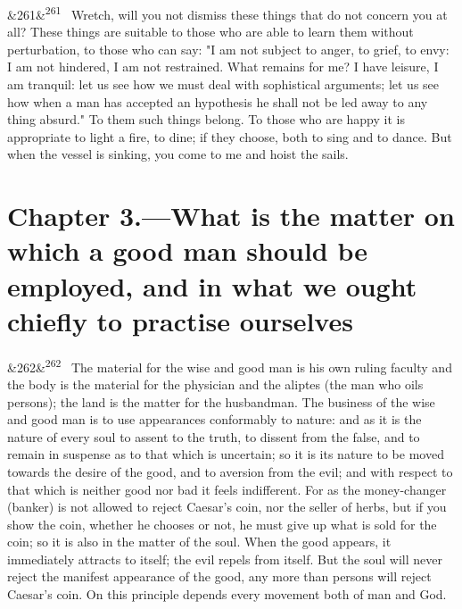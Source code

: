 \documentclass[12pt]{article}
\newcommand{\para}[1][]{\par\noindent\ifx&#1&\else\textsuperscript{\footnotesize #1}~\fi}
\begin{document}
\para[261] Wretch, will you not dismiss these things that do not concern you at all? These things are suitable to those who are able to learn them without perturbation, to those who can say: "I am not subject to anger, to grief, to envy: I am not hindered, I am not restrained. What remains for me? I have leisure, I am tranquil: let us see how we must deal with sophistical arguments; let us see how when a man has accepted an hypothesis he shall not be led away to any thing absurd." To them such things belong. To those who are happy it is appropriate to light a fire, to dine; if they choose, both to sing and to dance. But when the vessel is sinking, you come to me and hoist the sails.

\section*{Chapter 3.---What is the matter on which a good man should be employed, and in what we ought chiefly to practise ourselves}

\para[262] The material for the wise and good man is his own ruling faculty and the body is the material for the physician and the aliptes (the man who oils persons); the land is the matter for the husbandman. The business of the wise and good man is to use appearances conformably to nature: and as it is the nature of every soul to assent to the truth, to dissent from the false, and to remain in suspense as to that which is uncertain; so it is its nature to be moved towards the desire of the good, and to aversion from the evil; and with respect to that which is neither good nor bad it feels indifferent. For as the money-changer (banker) is not allowed to reject Caesar's coin, nor the seller of herbs, but if you show the coin, whether he chooses or not, he must give up what is sold for the coin; so it is also in the matter of the soul. When the good appears, it immediately attracts to itself; the evil repels from itself. But the soul will never reject the manifest appearance of the good, any more than persons will reject Caesar's coin. On this principle depends every movement both of man and God.
\end{document}
